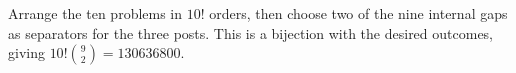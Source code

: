 Arrange the ten problems in $10!$ orders, then choose two of the nine internal gaps as separators for the three posts. This is a bijection with the desired outcomes, giving $10!\binom92=\boxed{130636800}$.
